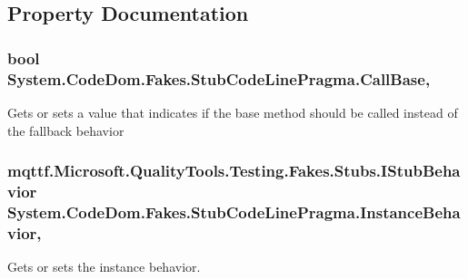 \subsection{Property Documentation}
\hypertarget{class_system_1_1_code_dom_1_1_fakes_1_1_stub_code_line_pragma_a8247adf43dc34edf125067fc44552763}{
\subsubsection[{Call\-Base}]{\setlength{\rightskip}{0pt plus 5cm}bool System.\-Code\-Dom.\-Fakes.\-Stub\-Code\-Line\-Pragma.\-Call\-Base\hspace{0.3cm}{\ttfamily [get]}, {\ttfamily [set]}}}\label{class_system_1_1_code_dom_1_1_fakes_1_1_stub_code_line_pragma_a8247adf43dc34edf125067fc44552763}


Gets or sets a value that indicates if the base method should be called instead of the fallback behavior

\hypertarget{class_system_1_1_code_dom_1_1_fakes_1_1_stub_code_line_pragma_a8beb1284e9f0b0bf91b01f5e57afcbdd}{
\subsubsection[{Instance\-Behavior}]{\setlength{\rightskip}{0pt plus 5cm}mqttf.\-Microsoft.\-Quality\-Tools.\-Testing.\-Fakes.\-Stubs.\-I\-Stub\-Behavior System.\-Code\-Dom.\-Fakes.\-Stub\-Code\-Line\-Pragma.\-Instance\-Behavior\hspace{0.3cm}{\ttfamily [get]}, {\ttfamily [set]}}}\label{class_system_1_1_code_dom_1_1_fakes_1_1_stub_code_line_pragma_a8beb1284e9f0b0bf91b01f5e57afcbdd}


Gets or sets the instance behavior.

